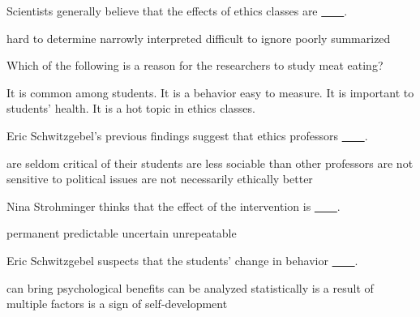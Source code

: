 \item Scientists generally believe that the effects of ethics classes are \uline{~~~~}.
\begin{tasks}
	\task hard to determine
	\task narrowly interpreted
	\task difficult to ignore
	\task poorly summarized
\end{tasks}
\item Which of the following is a reason for the researchers to study meat eating?
\begin{tasks}
	\task It is common among students.
	\task It is a behavior easy to measure.
	\task It is important to students' health.
	\task It is a hot topic in ethics classes.
\end{tasks}
\item Eric Schwitzgebel's previous findings suggest that ethics professors \uline{~~~~}.
\begin{tasks}
	\task are seldom critical of their students
	\task are less sociable than other professors
	\task are not sensitive to political issues
	\task are not necessarily ethically better
\end{tasks}
\item Nina Strohminger thinks that the effect of the intervention is \uline{~~~~}.
\begin{tasks}
	\task permanent
	\task predictable
	\task uncertain
	\task unrepeatable
\end{tasks}
\item Eric Schwitzgebel suspects that the students' change in behavior \uline{~~~~}.
\begin{tasks}
	\task can bring psychological benefits
	\task can be analyzed statistically
	\task is a result of multiple factors
	\task is a sign of self-development
\end{tasks}
